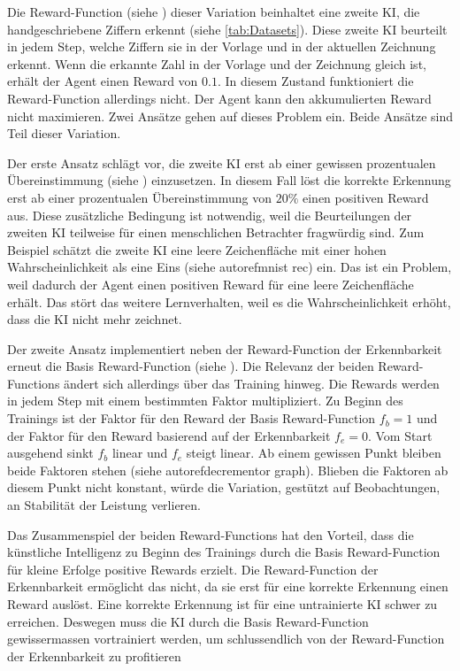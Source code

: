 Die Reward-Function (siehe ) dieser Variation beinhaltet
eine zweite KI, die handgeschriebene Ziffern erkennt (siehe
\autoref{tab:Datasets}). Diese zweite KI beurteilt in jedem Step, welche
Ziffern sie in der Vorlage und in der aktuellen  %
Zeichnung erkennt. Wenn die erkannte Zahl in der Vorlage und der Zeichnung
gleich ist, erhält der Agent einen Reward von $0.1$. In diesem Zustand
funktioniert die Reward-Function allerdings nicht. Der Agent kann den
akkumulierten Reward nicht maximieren. Zwei Ansätze gehen auf dieses Problem
ein. Beide Ansätze sind Teil dieser Variation.

Der erste Ansatz schlägt vor, die zweite KI erst ab einer gewissen prozentualen
Übereinstimmung (siehe ) einzusetzen. In diesem Fall
löst die korrekte Erkennung erst ab einer prozentualen Übereinstimmung von
$20\%$ einen positiven Reward aus. Diese zusätzliche Bedingung ist notwendig,
weil die Beurteilungen der zweiten KI teilweise für einen menschlichen
Betrachter fragwürdig sind. Zum Beispiel schätzt die zweite KI eine leere
Zeichenfläche mit einer hohen Wahrscheinlichkeit als eine Eins (siehe
autoref{mnist rec}) ein. Das ist ein Problem, weil dadurch der Agent einen
positiven Reward für eine leere Zeichenfläche erhält. Das stört das weitere
Lernverhalten, weil es die Wahrscheinlichkeit erhöht, dass die KI nicht mehr
zeichnet.


Der zweite Ansatz implementiert neben der Reward-Function der Erkennbarkeit
erneut die Basis Reward-Function (siehe ). Die Relevanz
der beiden Reward-Functions ändert sich allerdings über das Training hinweg. Die
Rewards werden in jedem Step mit einem bestimmten Faktor multipliziert. Zu
Beginn des Trainings ist der Faktor für den Reward der Basis Reward-Function
$f_b = 1$ und der Faktor für den Reward basierend auf der Erkennbarkeit $f_e =
0$. Vom Start ausgehend sinkt $f_b$ linear und $f_e$ steigt linear. Ab einem
gewissen Punkt bleiben beide Faktoren stehen (siehe autoref{decrementor graph}).
Blieben die Faktoren ab diesem Punkt nicht konstant, würde die Variation,
gestützt auf Beobachtungen, an Stabilität der Leistung verlieren.


Das Zusammenspiel der beiden Reward-Functions hat den Vorteil, dass die
künstliche Intelligenz zu Beginn des Trainings durch die Basis Reward-Function
für kleine Erfolge positive Rewards erzielt. Die Reward-Function der
Erkennbarkeit ermöglicht das nicht, da sie erst für eine korrekte Erkennung
einen Reward auslöst. Eine korrekte Erkennung ist für eine untrainierte KI
schwer zu erreichen. Deswegen muss die KI durch die Basis Reward-Function
gewissermassen vortrainiert werden, um schlussendlich von der Reward-Function
der Erkennbarkeit zu profitieren


